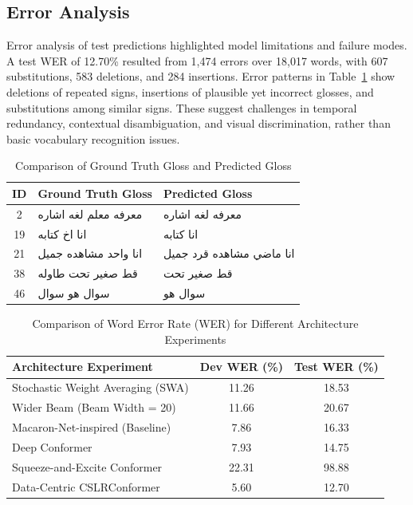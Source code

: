\subsection{Error Analysis}
Error analysis of test predictions highlighted model limitations and failure modes. A test WER of 12.70\% resulted from 1,474 errors over 18,017 words, with 607 substitutions, 583 deletions, and 284 insertions. Error patterns in Table~\ref{tab:gloss_comparison} show deletions of repeated signs, insertions of plausible yet incorrect glosses, and substitutions among similar signs. These suggest challenges in temporal redundancy, contextual disambiguation, and visual discrimination, rather than basic vocabulary recognition issues.

\begin{table}[h]
    \centering
    \begin{tabularx}{\columnwidth}{c >{\Centering}X >{\Centering}X}
        \toprule
        \textbf{ID} & \textbf{Ground Truth Gloss} & \textbf{Predicted Gloss} \\
        \midrule
        2  & \textarabic{معرفه معلم لغه اشاره} & \textarabic{معرفه لغه اشاره} \\
        19 & \textarabic{انا اخ كتابه} & \textarabic{انا كتابه} \\
        21 & \textarabic{انا واحد مشاهده جميل} & \textarabic{انا ماضي مشاهده قرد جميل} \\
        38 & \textarabic{قط صغير تحت طاوله} & \textarabic{قط صغير تحت} \\
        46 & \textarabic{سوال هو سوال} & \textarabic{سوال هو} \\
        \bottomrule
    \end{tabularx}
    \caption{Comparison of Ground Truth Gloss and Predicted Gloss}
    \label{tab:gloss_comparison}
\end{table}

\begin{table}[t] %
    \centering
    \begin{tabular}{lcc}
        \toprule
        \textbf{Architecture Experiment} & \textbf{Dev WER (\%)} & \textbf{Test WER (\%)}  \\
        \midrule
        Stochastic Weight Averaging (SWA) & 11.26& 18.53\\
        Wider Beam (Beam Width = 20) & 11.66 & 20.67  \\
        Macaron-Net-inspired (Baseline) & 7.86 & 16.33  \\
        Deep Conformer& 7.93 & 14.75  \\
        Squeeze-and-Excite Conformer & 22.31 & 98.88  \\
        Data-Centric CSLRConformer& 5.60 & 12.70  \\
        \bottomrule
    \end{tabular}
    \caption{Comparison of Word Error Rate (WER) for Different Architecture Experiments}
    \label{tab:arch_comparison_wide}
\end{table}

